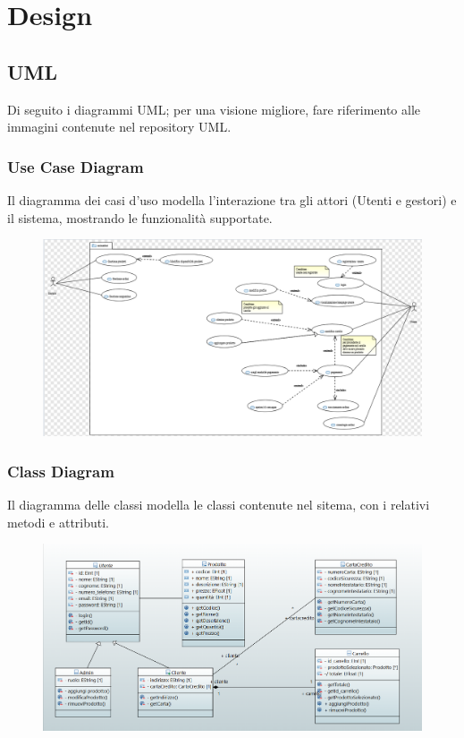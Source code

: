 \documentclass[a4paper,12pt]{article}
\begin{document}
\section{Design}
\subsection{UML}
Di seguito i diagrammi UML; per una visione migliore, fare riferimento alle immagini contenute nel repository UML.
\subsubsection{Use Case Diagram}
Il diagramma dei casi d'uso modella l'interazione tra gli attori (Utenti e gestori) e il sistema, mostrando le funzionalità supportate.
\begin{figure}[H]
    \centering
    \includegraphics[width=1\textwidth]{../UML/UML png/UseCaseDiagram.png}
    \label{fig:Use Case Diagram}
\end{figure}

\subsubsection{Class Diagram}
Il diagramma delle classi modella le classi contenute nel sitema, con i relativi metodi e attributi.
\begin{figure}[H]
    \centering
    \includegraphics[width=1\textwidth]{../UML/UML png/ClassDiagram.png}
    \label{fig:Class Diagram}
\end{figure}
\end{document}
